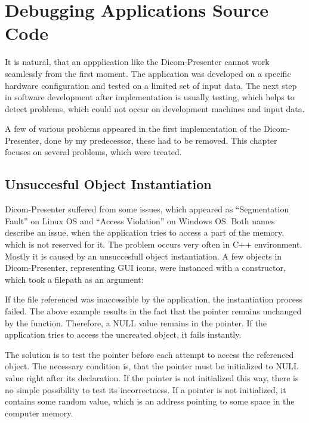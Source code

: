 \chapter{Debugging Applications Source Code}
\label{debuggingchapt}
\vspace{-10mm}
It is natural, that an appplication like the Dicom-Presenter cannot work seamlessly from the first moment. The application was developed on a specific hardware configuration and tested on a limited set of input data. The next step in software development after implementation is usually testing, which helps to detect problems, which could not occur on development machines and input data.

A few of various problems appeared in the first implementation of the Dicom-Presenter, done by my predecessor\cite{neskudla}, these had to be removed. This chapter focuses on several problems, which were treated.

\section{Unsuccesful Object Instantiation}
Dicom-Presenter suffered from some issues, which appeared as ``Segmentation Fault'' on Linux OS and ``Access Violation'' on Windows OS. Both names describe an issue, when the application tries to access a part of the memory, which is not reserved for it. The problem occurs very often in C++ environment. Mostly it is caused by an unsuccesfull object instantiation. A few objects in Dicom-Presenter, representing GUI icons, were instanced with a constructor, which took a filepath as an argument:


If the file referenced was inaccessible by the application, the instantiation process failed. The above example results in the fact that the  pointer remains unchanged by the  function. Therefore, a NULL value remains in the pointer. If the application tries to access the uncreated object, it fails instantly.

The solution is to test the pointer before each attempt to access the referenced object. The necessary condition is, that the pointer  must be initialized to NULL value right after its declaration. If the pointer is not initialized this way, there is no simple possibility to test its incorrectness. If a pointer is not initialized, it contains some random value, which is an address pointing to some space in the computer memory.

